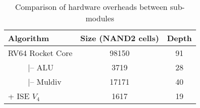 \begin{table}
\caption{Comparison of hardware overheads between sub-modules}
\label{tab:res:sw:hardcost2}
\begin{tabular}{lcc}
\toprule            
Algorithm        &     Size (NAND2 cells)     & Depth \\

\midrule
RV64 Rocket Core &    98150     &   91  \\
~~~~~|-- ALU     &     3719     &   28  \\
~~~~~|-- Muldiv  &    17171     &   40  \\
+ ISE $V_4$      &     1617     &   19  \\ 

\bottomrule
\end{tabular}
\end{table}


